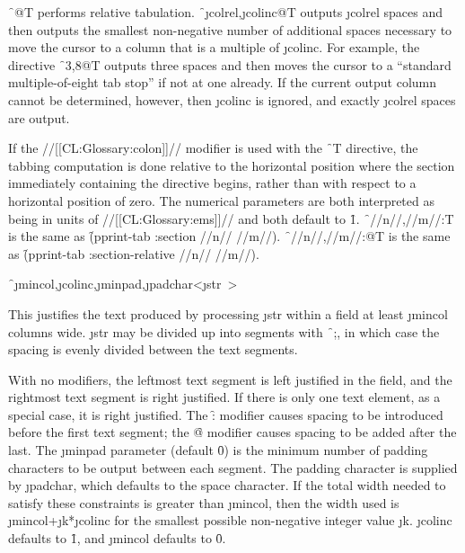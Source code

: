 \f{~@T} performs relative tabulation. \f{~\j{colrel},\j{colinc}@T} outputs \j{colrel} spaces and then outputs the smallest non-negative number of additional spaces necessary to move the cursor to a column that is a multiple                                        of \j{colinc}.  For example, the directive  \f{~3,8@T} outputs three spaces and then moves the cursor to a ``standard multiple-of-eight tab stop'' if not at one already. If the current output column cannot be determined, however, then \j{colinc} is ignored, and exactly \j{colrel} spaces are output.

If the //[[CL:Glossary:colon]]// modifier is used with the \f{~T} directive, the tabbing computation is done relative to the horizontal position where the section immediately containing the directive begins, rather than with respect to a horizontal position of zero.  The numerical parameters are both interpreted as being in units of //[[CL:Glossary:ems]]// and both default to \f{1}. \f{~//n//,//m//:T} is the same as 
  \f{(pprint-tab :section //n// //m//)}. \f{~//n//,//m//:@T} is the same as
  \f{(pprint-tab :section-relative //n// //m//)}.

\endsubsubsection%

  

\f{~\j{mincol},\j{colinc},\j{minpad},\j{padchar}<\j{str}~>}

This justifies the text produced by processing \j{str} within a field at least \j{mincol} columns wide.  \j{str} may be divided up into segments with \f{~;}, in which case the spacing is evenly divided between the text segments.

With no modifiers, the leftmost text segment is left justified in the field, and the rightmost text segment is right justified.  If there is only one text element, as a special case, it is right justified. The \f{:} modifier causes                                             spacing to be introduced before the first text segment;  the  \f{@} modifier causes spacing to be added after the last. The \j{minpad} parameter (default \f{0}) is the minimum number of padding characters to be output between each segment. The padding character is supplied by \j{padchar}, which defaults to the space character. If the total width needed to satisfy these constraints is greater than \j{mincol}, then the width used is \j{mincol}+\j{k}*\j{colinc} for the smallest possible non-negative integer value \j{k}. \j{colinc} defaults to \f{1}, and \j{mincol} defaults to \f{0}.

